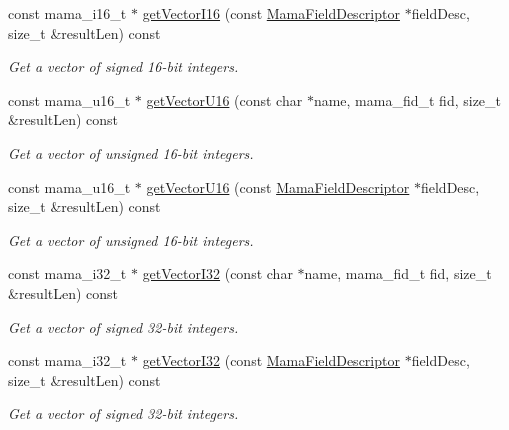 \begin{DoxyCompactItemize}
const mama\_\-i16\_\-t $\ast$ \hyperlink{classWombat_1_1MamaMsg_aaa1aa5dd44c7ff6594e3b77c7277fb23}{getVectorI16} (const \hyperlink{classWombat_1_1MamaFieldDescriptor}{MamaFieldDescriptor} $\ast$fieldDesc, size\_\-t \&resultLen) const 
\begin{DoxyCompactList}\small\item\em Get a vector of signed 16-\/bit integers. \item\end{DoxyCompactList}\item 
const mama\_\-u16\_\-t $\ast$ \hyperlink{classWombat_1_1MamaMsg_a2de75be6d8eade94fc3dfc8b7a246962}{getVectorU16} (const char $\ast$name, mama\_\-fid\_\-t fid, size\_\-t \&resultLen) const 
\begin{DoxyCompactList}\small\item\em Get a vector of unsigned 16-\/bit integers. \item\end{DoxyCompactList}\item 
const mama\_\-u16\_\-t $\ast$ \hyperlink{classWombat_1_1MamaMsg_aa3251dc415e9ed734f6d040c831db53f}{getVectorU16} (const \hyperlink{classWombat_1_1MamaFieldDescriptor}{MamaFieldDescriptor} $\ast$fieldDesc, size\_\-t \&resultLen) const 
\begin{DoxyCompactList}\small\item\em Get a vector of unsigned 16-\/bit integers. \item\end{DoxyCompactList}\item 
const mama\_\-i32\_\-t $\ast$ \hyperlink{classWombat_1_1MamaMsg_ae97d53b754809a3de1f707ccf2a67301}{getVectorI32} (const char $\ast$name, mama\_\-fid\_\-t fid, size\_\-t \&resultLen) const 
\begin{DoxyCompactList}\small\item\em Get a vector of signed 32-\/bit integers. \item\end{DoxyCompactList}\item 
const mama\_\-i32\_\-t $\ast$ \hyperlink{classWombat_1_1MamaMsg_ae4f34c1a72aa213b65ab541a85e923f3}{getVectorI32} (const \hyperlink{classWombat_1_1MamaFieldDescriptor}{MamaFieldDescriptor} $\ast$fieldDesc, size\_\-t \&resultLen) const 
\begin{DoxyCompactList}\small\item\em Get a vector of signed 32-\/bit integers. \item\end{DoxyCompactList}\item 

\end{DoxyCompactItemize}

